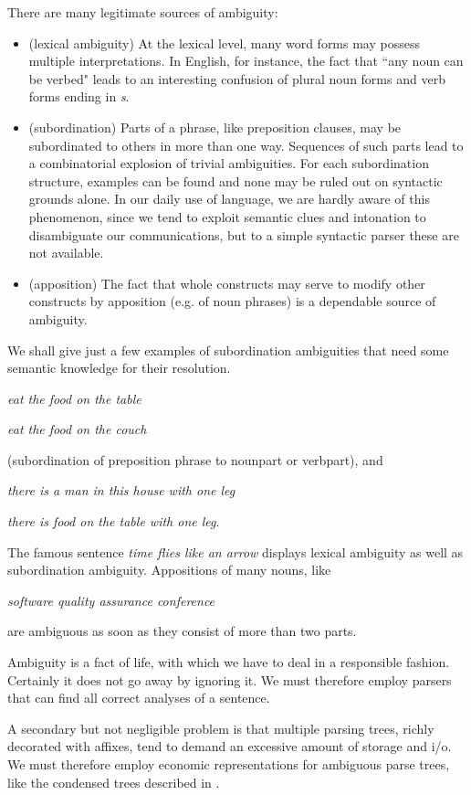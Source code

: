 There are many legitimate sources of ambiguity:
\begin{itemize}
\item (lexical ambiguity) At the lexical level, many word forms may possess
multiple interpretations. In English, for instance, the fact that ``any
noun can be verbed" leads to an interesting confusion of plural noun
forms and verb forms ending in {\sl s}.
\item (subordination) Parts of a phrase, like preposition clauses, may be
subordinated to others in more
than one way. Sequences of such parts lead to a combinatorial explosion
of trivial ambiguities. For each subordination structure, examples can
be found and none may be ruled out on syntactic grounds alone. In our
daily use of language, we are hardly aware of this phenomenon, since we
tend to exploit semantic clues and intonation to disambiguate our
communications, but to a simple syntactic parser these are not available.
\item (apposition) The fact that whole constructs may serve to modify
other constructs by apposition (e.g. of noun phrases) is a dependable
source of ambiguity.
\end{itemize}
We shall give just a few examples of subordination ambiguities that need
some semantic knowledge for their resolution.

{\sl eat the food on the table}

{\sl eat the food on the couch}

\noindent
(subordination of preposition phrase to nounpart or verbpart), and

{\sl there is a man in this house with one leg}

{\sl there is food on the table with one leg}.

The famous sentence {\sl time flies like an arrow} displays lexical
ambiguity as well as subordination ambiguity. Appositions of many nouns, like

{\sl software quality assurance conference}

\noindent
are ambiguous as soon as they consist of more than two parts.

Ambiguity is a fact of life, with which we have to deal in a responsible
fashion. Certainly it does not go away by ignoring it. We must
therefore employ parsers that can find all correct analyses of a sentence.

A secondary but not negligible problem is that multiple parsing trees,
richly decorated with affixes, tend to demand an excessive amount of
storage and i/o. We must therefore employ economic representations for
ambiguous parse trees, like the condensed trees described in \cite{l15}.

